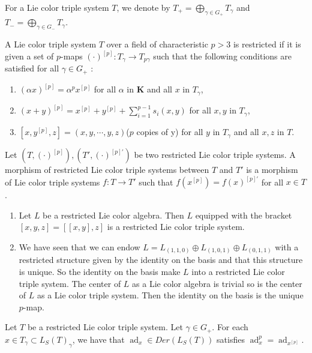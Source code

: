 \documentclass[11pt, twoside]{article}
\DeclareMathOperator{\ad}{ad}
\begin{document}
For a Lie color triple system $T$, we denote by $T_+=\bigoplus\limits_{\gamma\in G_+}T_\gamma $ and $T_-= \bigoplus\limits_{\gamma\in G_-}T_\gamma $.

\begin{defi}\label{d4.1}
    A Lie color triple system $T$ over a field of characteristic $p>3$ is restricted if it is given a set of $p$-maps $(\cdot)^{[p]}:T_\gamma\to T_{p\gamma} $ such that the following conditions are satisfied for all $\gamma\in G_+ $ : \begin{enumerate}
        
        \item $(\alpha x)^{[p]}= \alpha^p x^{[p]} $ for all $\alpha$ in $\mathbf{K}$ and all $x$ in $T_\gamma$,
        \item $(x+y)^{[p]}= x^{[p]}+y^{[p]}+ \sum\limits_{i=1}^{p-1}s_i(x,y) $ for all $x,y$ in $T_\gamma$,
        \item  $[x,y^{[p]},z]=(x,y,\cdots,y,z) $($p$ copies of y) for all $y$ in $T_\gamma$ and all $x,z$ in $T$.
    \end{enumerate}
\end{defi}

\begin{defi}
    Let $(T,(\cdot)^{[p]}), (T',(\cdot)^{[p]'})$ be two restricted Lie color triple systems. A morphism of restricted Lie color triple systems between $T$ and $T'$ is a morphism of Lie color triple systems $f:T\to T' $ such that $f(x^{[p]})=f(x)^{[p]'} $ for all $x\in T$.
\end{defi}

\begin{ex}
\begin{enumerate}
    \item   Let $L$ be a restricted Lie color algebra. Then $L$ equipped with the bracket $[x,y,z]=[[x,y],z] $ is a restricted Lie color triple system.
    \item We have seen that we can endow $L= L_{(1,1,0)}\oplus L_{(1,0,1)} \oplus L_{(0,1,1)}  $ with a restricted structure given by the identity on the basis and that this structure is unique. So the identity on the basis make $L $ into a restricted Lie color triple system. The center of $L$ as a Lie color algebra is trivial so is the center of $L$ as a Lie color triple system. Then the identity on the basis is the unique  $p$-map.
    \end{enumerate}
\end{ex}

\begin{prop}
    Let $T$ be a restricted Lie color triple system. Let $\gamma\in G_+ $. For each $x\in T_\gamma\subset L_S(T)_\gamma$, we have that $\ad_x\in Der(L_S(T)) $ satisfies $\ad_x^p= \ad_{x^{[p]}} $.
\end{prop}
\end{document}

